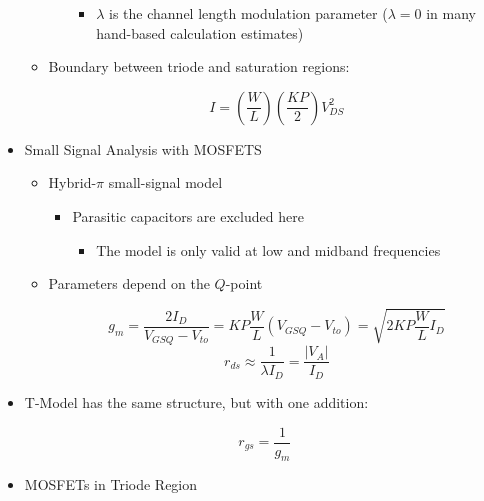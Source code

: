 \begin{itemize}
\begin{itemize}
\begin{itemize}
\begin{itemize}
              \item $\lambda$ is the channel length modulation parameter ($\lambda=0$ in many hand-based calculation estimates)

            \end{itemize}

        \end{itemize}

      \item Boundary between triode and saturation regions:

        $$I=\left( \frac{W}{L} \right)\left( \frac{KP}{2} \right)V_{DS}^2$$

    \end{itemize}

  \item Small Signal Analysis with MOSFETS

    \begin{itemize}

      \item Hybrid-$\pi$ small-signal model

        \begin{itemize}

          \item Parasitic capacitors are excluded here

            \begin{itemize}

              \item The model is only valid at low and midband frequencies

            \end{itemize}

        \end{itemize}

      \item Parameters depend on the $Q$-point

        $$g_m=\frac{2I_D}{V_{GSQ}-V_{to}}=KP\frac{W}{L}(V_{GSQ}-V_{to})=\sqrt{2KP\frac{W}{L}I_D}$$
        $$r_{ds}\approx\frac{1}{\lambda I_D}=\frac{|V_A|}{I_D}$$

    \end{itemize}

  \item T-Model has the same structure, but with one addition:

    $$r_{gs}=\frac{1}{g_m}$$

  \item MOSFETs in Triode Region


\end{itemize}
